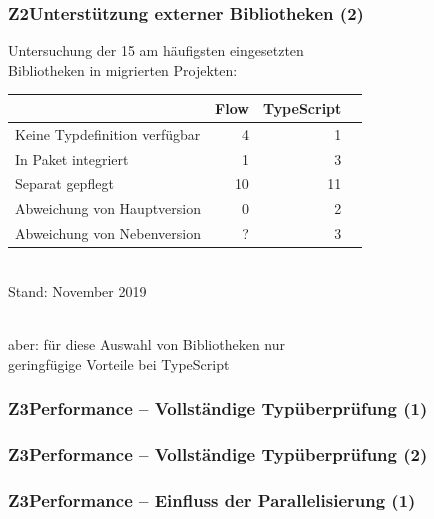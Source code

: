       \begin{frame}
        \frametitle{Z2\hspace{0.75em}Unterstützung externer Bibliotheken (2)}
        Untersuchung der 15 am häufigsten eingesetzten\\Bibliotheken in migrierten Projekten:\\[1em]
        {
          \footnotesize
          \begin{tabu} to 
            \midrule
            \rowfont{\bfseries} {} & Flow & TypeScript \\
            \midrule
            Keine Typdefinition verfügbar &  4 &  1 \\
            In Paket integriert           &  1 &  3 \\
            Separat gepflegt              & 10 & 11 \\
            \midrule
            Abweichung von Hauptversion   &  0 &  2 \\
            Abweichung von Nebenversion   &  ? &  3 \\
            \midrule
          \end{tabu}
          \\[.75em]
          Stand: November 2019
        }
        \\[1.25em]
        aber: für diese Auswahl von Bibliotheken nur\\geringfügige Vorteile bei TypeScript
      \end{frame}

      \begin{frame}
        \frametitle{Z3\hspace{0.75em}Performance -- Vollständige Typüberprüfung (1)}
        
      \end{frame}

      \begin{frame}
        \frametitle{Z3\hspace{0.75em}Performance -- Vollständige Typüberprüfung (2)}
        
      \end{frame}

      \begin{frame}
        \frametitle{Z3\hspace{0.75em}Performance -- Einfluss der Parallelisierung (1)}
        
      \end{frame}

